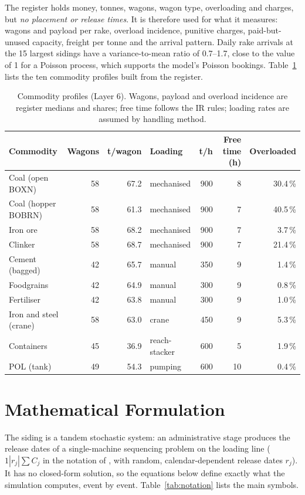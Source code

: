 The register holds money, tonnes, wagons, wagon type, overloading and charges, but \emph{no placement or release times}. It is therefore used for what it measures: wagons and payload per rake, overload incidence, punitive charges, paid-but-unused capacity, freight per tonne and the arrival pattern. Daily rake arrivals at the 15 largest sidings have a variance-to-mean ratio of 0.7--1.7, close to the value of 1 for a Poisson process, which supports the model's Poisson bookings. Table~\ref{tab:commodities} lists the ten commodity profiles built from the register.

\begin{table}[!htbp]
\centering
\caption[Commodity profiles]{Commodity profiles (Layer 6). Wagons, payload and overload incidence are register medians and shares; free time follows the IR rules; loading rates are assumed by handling method.}
\label{tab:commodities}
\small
\begin{tabular}{@{}lrrlrrr@{}}
\toprule
\textbf{Commodity} & \textbf{Wagons} & \textbf{t/wagon} & \textbf{Loading} & \textbf{t/h} & \textbf{Free time (h)} & \textbf{Overloaded} \\
\midrule
Coal (open BOXN) & 58 & 67.2 & mechanised & 900 & 8 & 30.4\,\% \\
Coal (hopper BOBRN) & 58 & 61.3 & mechanised & 900 & 7 & 40.5\,\% \\
Iron ore & 58 & 68.2 & mechanised & 900 & 7 & 3.7\,\% \\
Clinker & 58 & 68.7 & mechanised & 900 & 7 & 21.4\,\% \\
Cement (bagged) & 42 & 65.7 & manual & 350 & 9 & 1.4\,\% \\
Foodgrains & 42 & 64.9 & manual & 300 & 9 & 0.8\,\% \\
Fertiliser & 42 & 63.8 & manual & 300 & 9 & 1.0\,\% \\
Iron and steel (crane) & 58 & 63.0 & crane & 450 & 9 & 5.3\,\% \\
Containers & 45 & 36.9 & reach-stacker & 600 & 5 & 1.9\,\% \\
POL (tank) & 49 & 54.3 & pumping & 600 & 10 & 0.4\,\% \\
\bottomrule
\end{tabular}
\end{table}

\section{Mathematical Formulation}
\label{sec:form}
The siding is a tandem stochastic system: an administrative stage produces the release dates of a single-machine sequencing problem on the loading line ($1|r_j|\sum C_j$ in the notation of \cite{graham}, with random, calendar-dependent release dates $r_j$). It has no closed-form solution, so the equations below define exactly what the simulation computes, event by event. Table~\ref{tab:notation} lists the main symbols.

